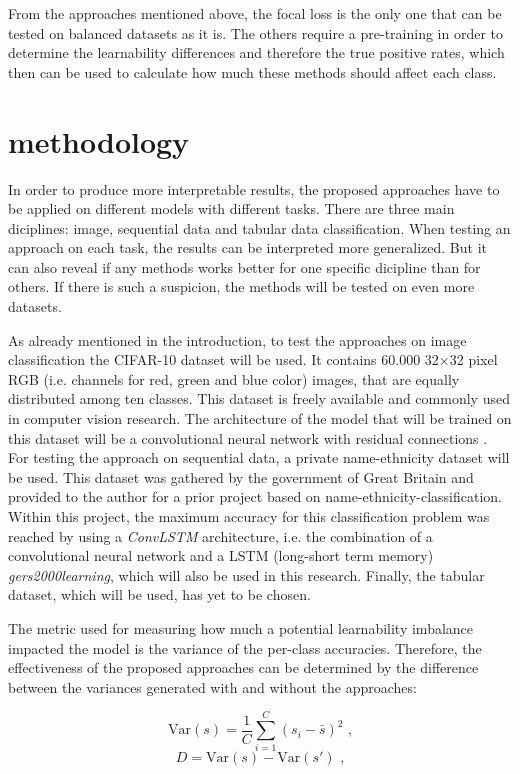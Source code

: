 \documentclass[journal]{IEEEtran}
\begin{document}
From the approaches mentioned above, the focal loss is the only one that can be tested on balanced datasets as it is. 
The others require a pre-training in order to determine the learnability differences and therefore the true positive rates, which then can be used to calculate how much these methods should affect each class.

\section{methodology}
In order to produce more interpretable results, the proposed approaches have to be applied on different models with different tasks. 
There are three main diciplines: image, sequential data and tabular data classification. 
When testing an approach on each task, the results can be interpreted more generalized. 
But it can also reveal if any methods works better for one specific dicipline than for others. 
If there is such a suspicion, the methods will be tested on even more datasets.

As already mentioned in the introduction, to test the approaches on image classification the CIFAR-10 dataset will be used.
It contains 60.000 32$\times$32 pixel RGB (i.e. channels for red, green and blue color) images, that are equally distributed among ten classes.
This dataset is freely available and commonly used in computer vision research.
The architecture of the model that will be trained on this dataset will be a convolutional neural network \cite{lecun1989backpropagation} with residual connections \cite{he2016deep}.
For testing the approach on sequential data, a private name-ethnicity dataset will be used.
This dataset was gathered by the government of Great Britain and provided to the author for a prior project based on name-ethnicity-classification.
Within this project, the maximum accuracy for this classification problem was reached by using a \emph{ConvLSTM} architecture, i.e. the combination of a convolutional neural network and a LSTM (long-short term memory) \emph{gers2000learning}, which will also be used in this research. 
Finally, the tabular dataset, which will be used, has yet to be chosen.

The metric used for measuring how much a potential learnability imbalance impacted the model is the variance of the per-class accuracies.
Therefore, the effectiveness of the proposed approaches can be determined by the difference between the variances generated with and without the approaches:

\[ \text{Var}(s) = \frac{1}{C} \sum_{i=1}^{C} (s_i - \bar{s})^2 \text{ ,} \]
\[ D = \text{Var}(s) - \text{Var}(s') \text{ ,} \]
\end{document}

